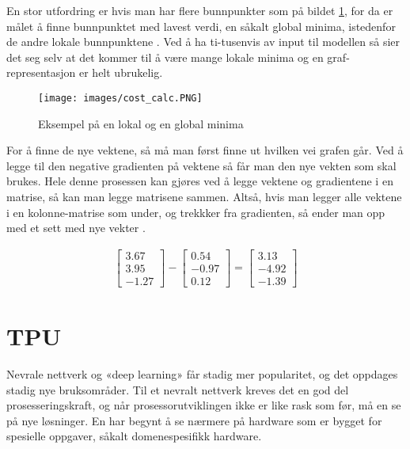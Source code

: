 En stor utfordring er hvis man har flere bunnpunkter som på bildet \ref{fig:kostnad}, for da er målet å finne bunnpunktet med lavest verdi, en såkalt global minima, istedenfor de andre lokale bunnpunktene \cite{neural_net}. Ved å ha ti-tusenvis av input til modellen så sier det seg selv at det kommer til å være mange lokale minima og en graf-representasjon er helt ubrukelig.

\begin{figure}[ht]
    \centering
    \texttt{[image: images/cost\_calc.PNG]}
    \caption{Eksempel på en lokal og en global minima}
    \label{fig:kostnad}
\end{figure}

\newpage
For å finne de nye vektene, så må man først finne ut hvilken vei grafen går. Ved å legge til den negative gradienten på vektene så får man den nye vekten som skal brukes. Hele denne prosessen kan gjøres ved å legge vektene og gradientene i en matrise, så kan man legge matrisene sammen. Altså, hvis man legger alle vektene i en kolonne-matrise som under, og trekkker fra gradienten, så ender man opp med et sett med nye vekter \cite{neural_net}.

\begin{align}
	\begin{bmatrix}
		 3.67 \\
		3.95 \\
		-1.27
	\end{bmatrix} - 
	\begin{bmatrix}
		 0.54 \\
		-0.97 \\
		 0.12
	\end{bmatrix} = 
	\begin{bmatrix}
		 3.13 \\
		-4.92 \\
		-1.39
	\end{bmatrix}
\end{align}


\newpage
\section{TPU}
Nevrale nettverk og «deep learning» får stadig mer popularitet, og det oppdages stadig nye bruksområder. Til et nevralt nettverk kreves det en god del prosesseringskraft, og når prosessorutviklingen ikke er like rask som før, må en se på nye løsninger. En har begynt å se nærmere på hardware som er bygget for spesielle oppgaver, såkalt domenespesifikk hardware. 


